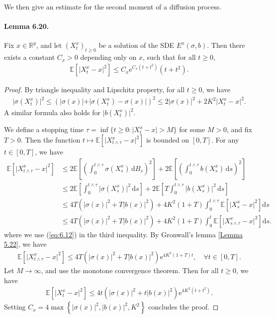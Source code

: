 \documentclass{article}
\numberwithin{equation}{section}
\newcommand{\e}{\mathrm{e}}
\newcommand{\E}{\mathbb{E}}
\renewcommand{\d}{\mathrm{d}}
\theoremstyle{plain}
\theoremstyle{definition}
\begin{document}
We then give an estimate for the second moment of a diffusion process.
\paragraph{Lemma 6.20.\label{lemma:6.20}} Fix $x\in\mathbb{R}^p$, and let $(X_t^x)_{t\geq 0}$ be a solution of the SDE $E^x(\sigma,b)$. Then there exists a constant $C_x>0$ depending only on $x$, such that for all $t\geq 0$,
\begin{align*}
	\E\left[\vert X_t^x - x\vert^2\right]\leq C_x\e^{C_x(t+t^2)}(t+t^2).
\end{align*}
\begin{proof}
By triangle inequality and Lipschitz property, for all $t\geq 0$, we have
\begin{align*}
	\vert\sigma(X_t^x)\vert^2\leq\left(\vert\sigma(x)\vert + \vert\sigma(X_t^x)-\sigma(x)\vert\right)^2\leq 2\vert\sigma(x)\vert^2 + 2K^2\vert X_t^x-x\vert^2.\label{eq:6.12}\tag{6.12}
\end{align*}
A similar formula also holds for $\vert b(X_t^x)\vert^2$. 

We define a stopping time $\tau=\inf\{t\geq 0:\vert X_t^x-x\vert>M\}$ for some $M>0$, and fix $T>0$. Then the function $t\mapsto\E\left[\vert X_{t\wedge\tau}^x - x\vert^2\right]$ is bounded on $[0,T]$. For any $t\in[0,T]$, we have
\begin{align*}
	\E\left[\vert X_{t\wedge\tau}^x - x\vert^2\right]&\leq  2\E\left[\left(\int_0^{t\wedge\tau}\sigma(X_s^x)\,\d B_s\right)^2\right] + 2\E\left[\left(\int_0^{t\wedge\tau} b(X_s^x)\,\d s\right)^2\right]\\
	&\leq 2\E\left[\int_0^{t\wedge\tau}\vert\sigma(X_s^x)\vert^2\,\d s\right] + 2\E\left[T\int_0^{t\wedge\tau}\vert b(X_s^x)\vert^2\,\d s\right]\\
	&\leq 4T(\vert\sigma(x)\vert^2 + T\vert b(x)\vert^2) + 4K^2(1+T)\int_0^{t\wedge\tau}\E\left[\vert X_s^x-x\vert^2\right]\d s\\
	&\leq 4T(\vert\sigma(x)\vert^2 + T\vert b(x)\vert^2) + 4K^2(1+T)\int_0^t\E\left[\vert X_{s\wedge\tau}^x-x\vert^2\right]\d s.
\end{align*}
where we use (\ref{eq:6.12}) in the third inequality. By Gronwall's lemma [\hyperref[lemma:5.22]{Lemma 5.22}], we have
\begin{align*}
	\E\left[\vert X_{t\wedge\tau}^x - x\vert^2\right]\leq 4T(\vert\sigma(x)\vert^2 + T\vert b(x)\vert^2)\e^{4K^2(1+T)t},\quad\forall t\in[0,T].
\end{align*}
Let $M\to\infty$, and use the monotone convergence theorem. Then for all $t\geq 0$, we have
\begin{align*}
	\E\left[\vert X_t^x - x\vert^2\right]\leq 4t\left(\vert\sigma(x)\vert^2 + t\vert b(x)\vert^2\right)\e^{4K^2(t+t^2)}.
\end{align*}
Setting $C_x=4\max\left\{\vert\sigma(x)\vert^2,\vert b(x)\vert^2,K^2\right\}$ concludes the proof.
\end{proof}
\end{document}
